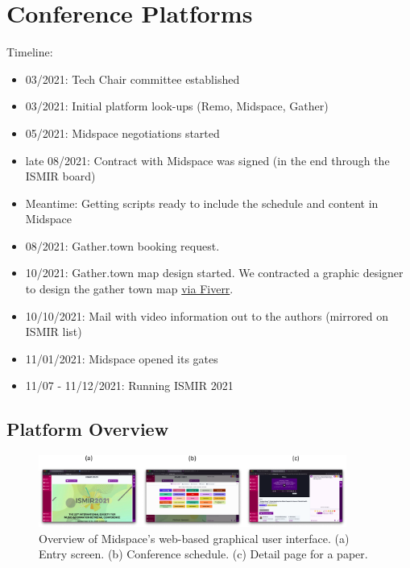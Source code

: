 \documentclass[%
10pt,								%
titlepage,						%
]
{scrartcl}
\begin{document}
\section{Conference Platforms}

    Timeline:
    \begin{itemize}
        \item 03/2021: Tech Chair committee established
        \item 03/2021: Initial platform look-ups (Remo, Midspace, Gather)
        \item 05/2021: Midspace negotiations started
        \item late 08/2021: Contract with Midspace was signed (in the end through the ISMIR board)
        \item Meantime: Getting scripts ready to include the schedule and content in Midspace
        \item 08/2021: Gather.town booking request.
        \item 10/2021: Gather.town map design started. We contracted a graphic designer to design the gather town map \href{https://www.fiverr.com/jc_shay/create-and-customize-your-gather-town-space-for-you}{via Fiverr}.
        \item 10/10/2021: Mail with video information out to the authors (mirrored on ISMIR list)
        \item 11/01/2021: Midspace opened its gates
        \item 11/07 - 11/12/2021: Running ISMIR 2021
    \end{itemize}

    \subsection{Platform Overview}

        \begin{figure}[t]%
            \centering
            \includegraphics[width=0.9\textwidth]{fig/midspace_overview.pdf}%
            \caption{Overview of Midspace's web-based graphical user interface. (a) Entry screen. (b) Conference schedule. (c) Detail page for a paper.}%
            \label{fig:midspace}%
        \end{figure}
\end{document}

